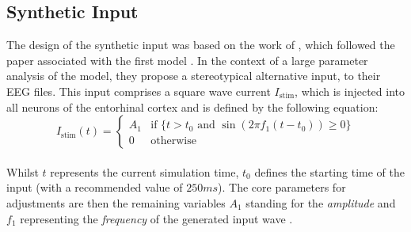     \subsection{Synthetic Input}
    The design of the synthetic input was based on the work of \textcite{Aussel.2021}, which followed the paper associated with the first model \cite{Aussel.2018}. In the context of a large parameter analysis of the model, they propose a stereotypical alternative input, to their EEG files. This input comprises a square wave current \(I_{\text{stim}}\), which is injected into all neurons of the entorhinal cortex and is defined by the following equation:
    \[I_{\text{stim}}(t) = 
    \begin{cases} 
    A_1 & \text{if } \{ t > t_0 \text{ and } \sin(2\pi f_1 (t - t_0)) \geq 0 \} \\ 
    0 & \text{otherwise} 
    \end{cases}\]
    \\
    Whilst \(t\) represents the current simulation time, \(t_0\) defines the starting time of the input (with a recommended value of \(250ms\)). The core parameters for adjustments are then the remaining variables \(A_1\) standing for the \textit{amplitude} and \(f_1\) representing the \textit{frequency} of the generated input wave \cite{Aussel.2021}.

